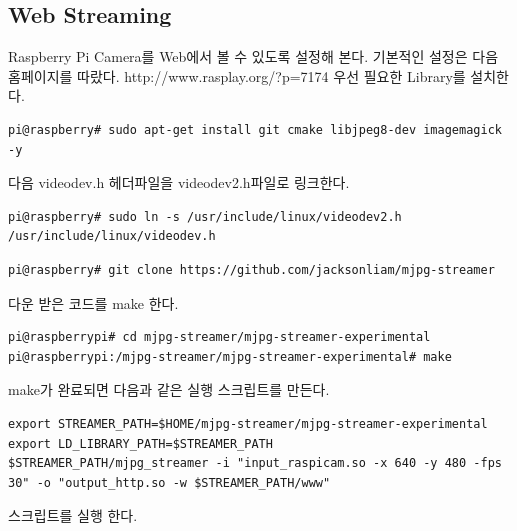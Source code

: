 \documentclass[11pt
  , a4paper
  , article
  , oneside
]{memoir}
\begin{document}
\subsection{Web Streaming}
Raspberry Pi Camera를 Web에서 볼 수 있도록 설정해 본다.
기본적인 설정은 다음 홈페이지를 따랐다.
http://www.rasplay.org/?p=7174
우선 필요한 Library를 설치한다.
\begin{lstlisting}[style=termstyle]
pi@raspberry# sudo apt-get install git cmake libjpeg8-dev imagemagick -y
\end{lstlisting}
다음 videodev.h 헤더파일을 videodev2.h파일로 링크한다.
\begin{lstlisting}[style=termstyle]
pi@raspberry# sudo ln -s /usr/include/linux/videodev2.h /usr/include/linux/videodev.h
\end{lstlisting}
\begin{lstlisting}[style=termstyle]
pi@raspberry# git clone https://github.com/jacksonliam/mjpg-streamer
\end{lstlisting}
다운 받은 코드를 make 한다.
\begin{lstlisting}[style=termstyle]
pi@raspberrypi# cd mjpg-streamer/mjpg-streamer-experimental
pi@raspberrypi:/mjpg-streamer/mjpg-streamer-experimental# make
\end{lstlisting}
make가 완료되면 다음과 같은 실행 스크립트를 만든다.
\begin{lstlisting}[style=termstyle]
export STREAMER_PATH=$HOME/mjpg-streamer/mjpg-streamer-experimental
export LD_LIBRARY_PATH=$STREAMER_PATH
$STREAMER_PATH/mjpg_streamer -i "input_raspicam.so -x 640 -y 480 -fps 30" -o "output_http.so -w $STREAMER_PATH/www"
\end{lstlisting}
스크립트를 실행 한다.
\end{document}
